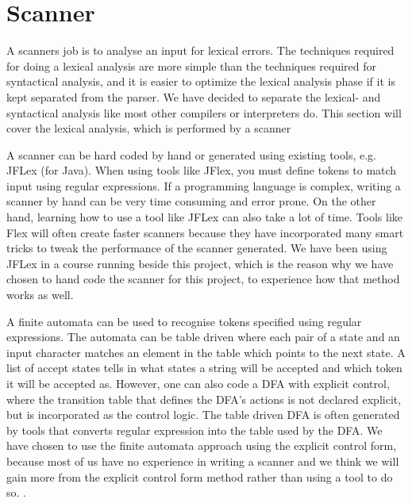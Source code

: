 \section{Scanner}
A scanners job is to analyse an input for lexical errors. The techniques required for doing a lexical analysis are more simple than the techniques required for syntactical analysis, and it is easier to optimize the lexical analysis phase if it is kept separated from the parser. We have decided to separate the lexical- and syntactical analysis like most other compilers or interpreters do. This section will cover the lexical analysis, which is performed by a scanner\cite[p.189]{sebesta2013}

A scanner can be hard coded by hand or generated using existing tools, e.g. JFLex (for Java). When using tools like JFlex, you must define tokens to match input using regular expressions. If a programming language is complex, writing a scanner by hand can be very time consuming and error prone. On the other hand, learning how to use a tool like JFLex can also take a lot of time. Tools like Flex will often create faster scanners because they have incorporated many smart tricks to tweak the performance of the scanner generated\cite[p.116]{fischer2009}.
 We have been using JFLex in a course running beside this project, which is the reason why we have chosen to hand code the scanner for this project, to experience how that method works as well.
 
A finite automata can be used to recognise tokens specified using regular expressions. The automata can be table driven where each pair of a state and an input character matches an element in the table which points to the next state. A list of accept states tells in what states a string will be accepted and which token it will be accepted as. However, one can also code a DFA with explicit control, where the transition table that defines the DFA's actions is not declared explicit, but is incorporated as the control logic. The table driven DFA is often generated by tools that converts regular expression into the table used by the DFA. We have chosen to use the finite automata approach using the explicit control form, because most of us have no experience in writing a scanner and we think we will gain more from the explicit control form method rather than using a tool to do so.
\cite[p.94]{fischer2009}.

